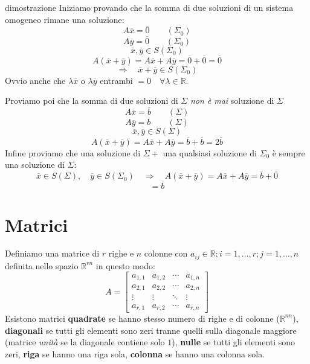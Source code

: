 \documentclass[x11names]{article}
\begin{document}
\begin{es}{dimostrazione}
Iniziamo provando che la somma di due soluzioni di un sistema omogeneo rimane una soluzione:
\[
A \overline{x} = \overline{0} \qquad \left(\Sigma_0\right)
\] 
\[
A \overline{y} = \overline{0} \qquad \left(\Sigma_0\right)
\] 
\[
	\overline{x},\overline{y} \in S\left(\Sigma_0\right)
\] 
\[
A\left(\overline{x} + \overline{y}\right) = A\overline{x} + A\overline{y} = \overline{0} + \overline{0} = \overline{0} 
\] 
\[
\Rightarrow \quad \overline{x} + \overline{y} \in S\left(\Sigma_0\right)
\] 
Ovvio anche che  $\lambda \overline{x}$ o $\lambda \overline{y}$ entrambi $=0 \quad \forall \lambda \in \mathbb{R}$.
 
Proviamo poi che la somma di due soluzioni di $\Sigma$ \textit{non è mai} soluzione di $\Sigma$
\[
A \overline{x} = \overline{b} \qquad \left(\Sigma\right)
\] 
\[
A \overline{y} = \overline{b} \qquad \left(\Sigma\right)
\] 
\[
	\overline{x},\overline{y} \in S\left(\Sigma\right)
\] 
\[
A\left(\overline{x}+\overline{y}\right) = A\overline{x} + A\overline{y} = \overline{b} + \overline{b} = 2\overline{b}
\] 
Infine proviamo che una soluzione di $\Sigma + $  una qualsiasi soluzione di  $\Sigma_{0}$ è sempre una soluzione di $\Sigma$:
 \[
\overline{x} \in S\left(\Sigma\right), \quad \overline{y} \in S\left(\Sigma_0\right) \quad \Rightarrow \quad A\left(\overline{x} + \overline{y}\right) = A\overline{x} + A\overline{y} = \overline{b} + \overline{0}
\] 
\[
 = \overline{b} 
\]
\end{es}








\newpage
\section{Matrici}

Definiamo una matrice di $r$ righe e $n$ colonne con $a_{ij} \in \mathbb{R}; i = 1,\dots,r; j = 1,\dots,n$ definita nello spazio $\mathbb{R}^{rn}$ in questo modo:
$$
A=
\begin{bmatrix}a_{1,1}&a_{1,2}&\cdots &a_{1,n}\\a_{2,1}&a_{2,2}&\cdots &a_{2,n}\\ \vdots &\vdots &\ddots &\vdots \\a_{r,1}&a_{r,2}&\cdots &a_{r,n}\end{bmatrix}
$$
Esistono matrici \textbf{quadrate} se hanno stesso numero di righe e di colonne ($\mathbb{R}^{nn}$), \textbf{diagonali} se tutti gli elementi sono zeri tranne quelli sulla diagonale maggiore (matrice \textit{unità} se la diagonale contiene solo $1$), \textbf{nulle} se tutti gli elementi sono zeri, \textbf{riga} se hanno una riga sola, \textbf{colonna} se hanno una colonna sola.
\end{document}
